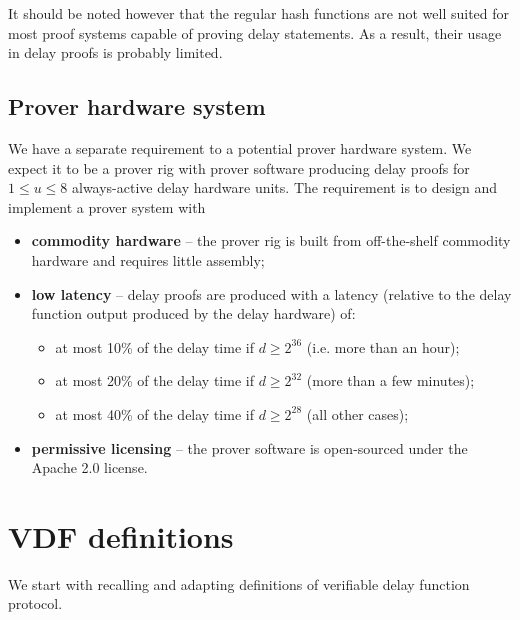 \documentclass{article}
\begin{document}
It should be noted however that the regular hash functions are not well suited for most proof systems capable of proving delay statements. As a result, their usage in delay proofs is probably limited. 

\subsection{ Prover hardware system}

We have a separate requirement to a potential  prover hardware system. We expect it to be a prover rig with prover software producing delay proofs for $1\leq u \leq 8$  always-active delay hardware units. The requirement is to design and implement a prover system with
\begin{itemize}
    \item  \textbf{commodity hardware} -- the prover rig is built from off-the-shelf commodity hardware and requires little assembly;
 \item  \textbf{low latency} -- delay proofs are produced with a latency (relative to the delay function output produced by the delay hardware) of:
 \begin{itemize}
     \item at most 10\% of the delay time if  $d\geq 2^{36}$ (i.e. more than an hour);
          \item at most 20\% of the delay time if  $d\geq 2^{32}$ (more than a few minutes);
               \item at most 40\% of the delay time if   $d \geq 2^{28}$ (all other cases);
 \end{itemize}
 \item \textbf{permissive licensing} -- the prover software is open-sourced under the Apache 2.0 license.
\end{itemize}



\section{VDF definitions}

We start with recalling and adapting definitions of verifiable delay function protocol. 
\end{document}
